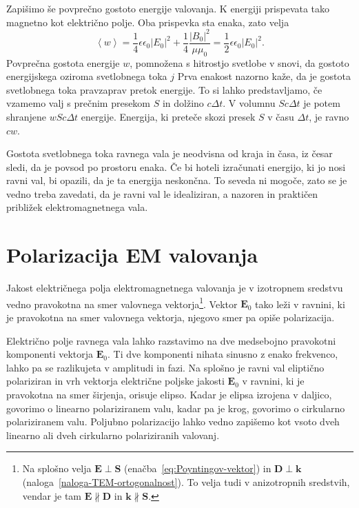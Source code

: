 Zapišimo še povprečno gostoto energije valovanja. 
K energiji prispevata tako magnetno kot električno polje. Oba prispevka sta enaka, zato velja
\begin{equation}
\left\langle w\right\rangle =\frac{1}{4}\epsilon\epsilon_{0}\left|E_{0}\right|^{2}+
\frac{1}{4}\frac{\left|B_{0}\right|^{2}}{\mu\mu_{0}}=\frac{1}{2}\epsilon\epsilon_{0}\left|E_{0}\right|^{2}.
\end{equation}
Povprečna gostota energije $w$, pomnožena s hitrostjo svetlobe v
snovi, da gostoto energijskega oziroma svetlobnega toka $j$
Prva enakost nazorno kaže, da je gostota svetlobnega toka pravzaprav pretok
energije. To si lahko predstavljamo, če vzamemo valj s prečnim presekom
$S$ in dolžino $c\Delta t$. V volumnu $Sc\Delta t$ je potem shranjene $wSc\Delta t$
energije. Energija, ki preteče skozi presek $S$ v času $\Delta t$,
je ravno $cw$. 

Gostota svetlobnega toka ravnega vala je neodvisna od kraja in časa, iz česar sledi,
da je povsod po prostoru enaka. Če bi hoteli izračunati energijo,
ki jo nosi ravni val, bi opazili, da je ta energija neskončna. To
seveda ni mogoče, zato se je vedno treba zavedati, da je ravni val
le idealiziran, a nazoren in praktičen približek elektromagnetnega
vala.

\section{Polarizacija EM valovanja}
Jakost električnega polja elektromagnetnega valovanja je v izotropnem
sredstvu vedno pravokotna na smer valovnega vektorja\footnote{Na splošno 
velja $\mathbf{E}\perp\mathbf{S}$ (enačba~\ref{eq:Poyntingov-vektor}) in 
$\mathbf{D}\perp\mathbf{k}$ (naloga~\ref{naloga-TEM-ortogonalnost}). 
To velja tudi v anizotropnih sredstvih, vendar je tam $\mathbf{E} \nparallel 
\mathbf{D}$ in $\mathbf k\nparallel\mathbf S$.}. Vektor $\mathbf{E}_0$
tako leži v ravnini, ki je pravokotna na smer valovnega vektorja, njegovo
smer pa opiše polarizacija. 

Električno polje ravnega vala lahko razstavimo na dve medsebojno 
pravokotni komponenti vektorja $\mathbf{E}_0$. Ti dve komponenti
nihata sinusno z enako frekvenco, lahko pa se razlikujeta v amplitudi in fazi. 
Na splošno je ravni val eliptično polariziran in
vrh vektorja električne poljske jakosti $\mathbf E_0$ v ravnini, ki je pravokotna 
na smer širjenja, orisuje elipso. Kadar je elipsa izrojena v daljico,
govorimo o linearno polariziranem valu,
kadar pa je krog, govorimo o cirkularno polariziranem valu. 
Poljubno polarizacijo lahko vedno zapišemo kot vsoto dveh linearno ali dveh 
cirkularno polariziranih valovanj. 

